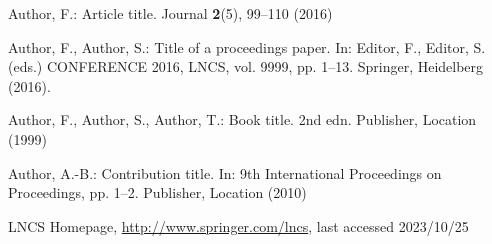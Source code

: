 
%
%
%
% 
% 
%
\begin{thebibliography}{8}
  Author, F.: Article title. Journal \textbf{2}(5), 99--110 (2016)

  Author, F., Author, S.: Title of a proceedings paper. In: Editor,
  F., Editor, S. (eds.) CONFERENCE 2016, LNCS, vol. 9999, pp. 1--13.
  Springer, Heidelberg (2016). 

  Author, F., Author, S., Author, T.: Book title. 2nd edn. Publisher,
  Location (1999)

  Author, A.-B.: Contribution title. In: 9th International Proceedings
  on Proceedings, pp. 1--2. Publisher, Location (2010)

  LNCS Homepage, \url{http://www.springer.com/lncs}, last accessed 2023/10/25
\end{thebibliography}
